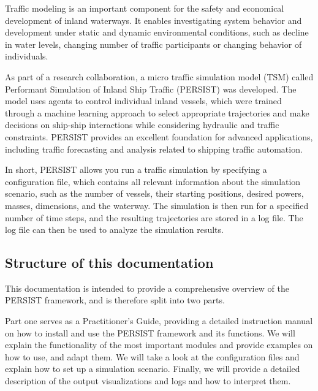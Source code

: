 \documentclass[
	a4paper, %
	12pt, %
]{persist}
\begin{document}
Traffic modeling is an important component for the safety and economical development of inland waterways. It enables investigating system behavior and development under static and dynamic environmental conditions, such as decline in water levels, changing number of traffic participants or changing behavior of individuals.

As part of a research collaboration, a micro traffic simulation model (TSM) called Performant Simulation of Inland Ship Traffic (PERSIST) was developed. The model uses agents to control individual inland vessels, which were trained through a machine learning approach to select appropriate trajectories and make decisions on ship-ship interactions while considering hydraulic and traffic constraints. PERSIST provides an excellent foundation for advanced applications, including traffic forecasting and analysis related to shipping traffic automation. 

In short, PERSIST allows you run a traffic simulation by specifying a configuration file, which contains all relevant information about the simulation scenario, such as the number of vessels, their starting positions, desired powers, masses, dimensions, and the waterway. The simulation is then run for a specified number of time steps, and the resulting trajectories are stored in a log file. The log file can then be used to analyze the simulation results.

\subsection{Structure of this documentation} %

This documentation is intended to provide a comprehensive overview of the PERSIST framework, and is therefore split into two parts. 

Part one serves as a Practitioner's Guide, providing a detailed instruction manual on how to install and use the PERSIST framework and its functions. We will explain the functionality of the most important modules and provide examples on how to use, and adapt them. We will take a look at the configuration files and explain how to set up a simulation scenario. Finally, we will provide a detailed description of the output visualizations and logs and how to interpret them.
\end{document}
